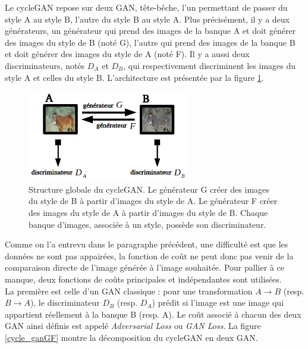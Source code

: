 Le cycleGAN repose sur deux GAN, tête-bêche, l'un permettant de passer du style A au style B, l'autre du style B au style A. Plus précisément, il y a deux générateurs, un générateur qui prend des images de la banque A et doit générer des images du style de B (noté G), l'autre qui prend des images de la banque B et doit générer des images du style de A (noté F). Il y a aussi deux discriminateurs, notés $D_A$ et $D_B$, qui respectivement discriminent les images du style A et celles du style B. L'architecture est présentée par la figure \ref{cycleDouble}.

\begin{figure}[!h]
\centering
\includegraphics[width=200pt]{"images/cycleDouble"}
\caption{Structure globale du cycleGAN. Le générateur G créer des images du style de B à partir d'images du style de A. Le générateur F créer des images du style de A à partir d'images du style de B. Chaque banque d'images, associée à un style, possède son discriminateur.}
\label{cycleDouble}
\end{figure}

Comme on l'a entrevu dans le paragraphe précédent, une difficulté est que les données ne sont pas appairées, la fonction de coût ne peut donc pas venir de la comparaison directe de l'image générée à l'image souhaitée. Pour pallier à ce manque, deux fonctions de coûts principales et indépendantes sont utilisées.\\

La première est celle d'un GAN classique : pour une transformation $ A \rightarrow B $ (resp. $ B \rightarrow A $), le discriminateur $ D_B $ (resp. $ D_A $) prédit si l'image est une image qui appartient réellement à la banque B (resp. A). Le coût associé à chacun des deux GAN ainsi définis est appelé \textit{Adversarial Loss} ou \textit{GAN Loss}. La figure \ref{cycle_ganGF} montre la décomposition du cycleGAN en deux GAN. \\

